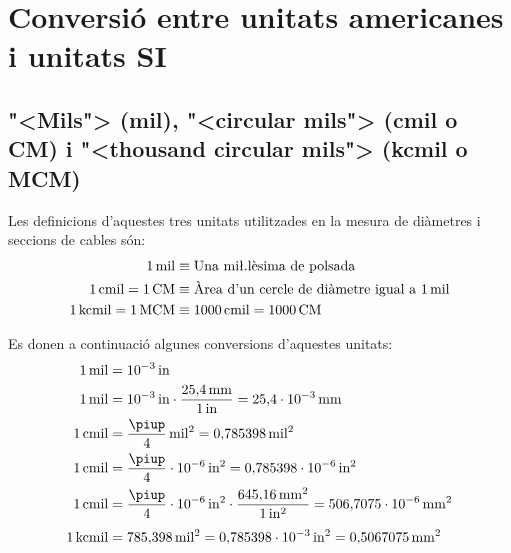 \section{Conversi\'{o} entre unitats americanes i unitats SI}

\subsection{{"<}Mils{">} (mil), {"<}circular mils{">} (cmil o CM) i {"<}thousand circular mils{">} (kcmil o MCM)}\label{sec:MCM}
  

  Les definicions d'aquestes tres unitats utilitzades en la mesura de di\`{a}metres i seccions de cables s\'{o}n:
\begin{align}
  1\unit{mil} &\equiv \text{Una mi{\l.l}\`{e}sima de polsada} \\
  1\unit{cmil} = 1\unit{CM} &\equiv  \text{\`{A}rea d'un cercle de di\`{a}metre igual a 1\unit{mil}} \\
  1\unit{kcmil} = 1\unit{MCM} &\equiv 1000\unit{cmil} = 1000\unit{CM}
\end{align}

  Es donen a continuaci\'{o} algunes conversions d'aquestes unitats:
\begin{align}
   1\unit{mil} &= 10^{-3}\unit{in}  \\
  1\unit{mil} &= 10^{-3}\unit{in} \cdot \frac{25{,}4\unit{mm}}{1\unit{in}} = 25{,}4 \cdot 10^{-3}\unit{mm}  \\
  1\unit{cmil} &= \frac{\piup}{4}\unit{mil^2} = 0{,}785398\unit{mil^2}   \\
   1\unit{cmil} &= \frac{\piup}{4}\cdot 10^{-6}\unit{in^2} = 0{,}785398\cdot 10^{-6}\unit{in^2} \\
   1\unit{cmil} &= \frac{\piup}{4} \cdot 10^{-6}\unit{in^2} \cdot \frac{645{,}16\unit{mm^2}}{1\unit{in^2}} = 506{,}7075\cdot 10^{-6}\unit{mm^2}
   \\[1ex]
   1\unit{kcmil} &= 785{,}398\unit{mil^2}  = 0{,}785398\cdot 10^{-3}\unit{in^2} = 0{,}5067075\unit{mm^2}
\end{align}

